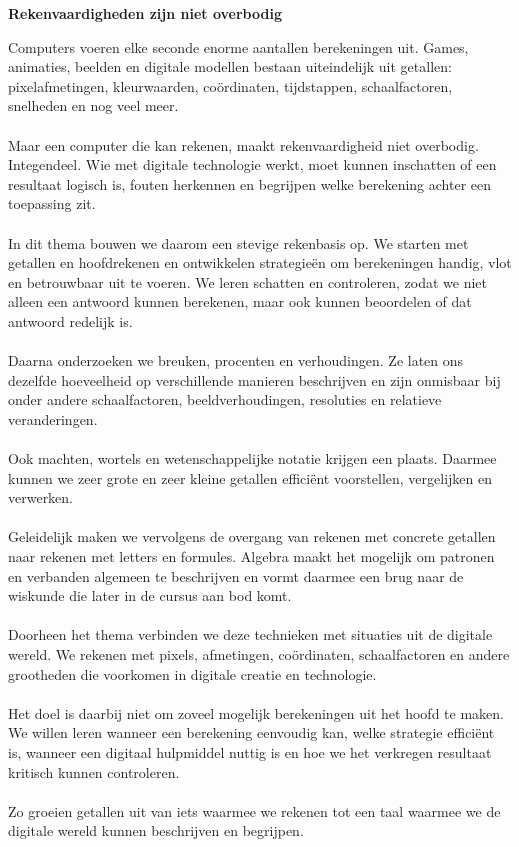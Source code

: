\documentclass{xourse}
\begin{document}
\begin{themaintro}{\textbf{Rekenvaardigheden zijn niet overbodig}}

  Computers voeren elke seconde enorme aantallen berekeningen uit. Games,
  animaties, beelden en digitale modellen bestaan uiteindelijk uit getallen:
  pixelafmetingen, kleurwaarden, coördinaten, tijdstappen, schaalfactoren,
  snelheden en nog veel meer.
  \\ \ \\
  Maar een computer die kan rekenen, maakt rekenvaardigheid niet overbodig.
  Integendeel. Wie met digitale technologie werkt, moet kunnen inschatten of
  een resultaat logisch is, fouten herkennen en begrijpen welke berekening
  achter een toepassing zit.
  \\ \ \\
  In dit thema bouwen we daarom een stevige rekenbasis op. We starten met
  getallen en hoofdrekenen en ontwikkelen strategieën om berekeningen handig,
  vlot en betrouwbaar uit te voeren. We leren schatten en controleren, zodat
  we niet alleen een antwoord kunnen berekenen, maar ook kunnen beoordelen of
  dat antwoord redelijk is.
  \\ \ \\
  Daarna onderzoeken we breuken, procenten en verhoudingen. Ze laten ons
  dezelfde hoeveelheid op verschillende manieren beschrijven en zijn
  onmisbaar bij onder andere schaalfactoren, beeldverhoudingen, resoluties en
  relatieve veranderingen.
  \\ \ \\
  Ook machten, wortels en wetenschappelijke notatie krijgen een plaats.
  Daarmee kunnen we zeer grote en zeer kleine getallen efficiënt voorstellen,
  vergelijken en verwerken.
  \\ \ \\
  Geleidelijk maken we vervolgens de overgang van rekenen met concrete
  getallen naar rekenen met letters en formules. Algebra maakt het mogelijk
  om patronen en verbanden algemeen te beschrijven en vormt daarmee een brug
  naar de wiskunde die later in de cursus aan bod komt.
  \\ \ \\
  Doorheen het thema verbinden we deze technieken met situaties uit de
  digitale wereld. We rekenen met pixels, afmetingen, coördinaten,
  schaalfactoren en andere grootheden die voorkomen in digitale creatie en
  technologie.
  \\ \ \\
  Het doel is daarbij niet om zoveel mogelijk berekeningen uit het hoofd te
  maken. We willen leren wanneer een berekening eenvoudig kan, welke strategie
  efficiënt is, wanneer een digitaal hulpmiddel nuttig is en hoe we het
  verkregen resultaat kritisch kunnen controleren.
  \\ \ \\
  Zo groeien getallen uit van iets waarmee we rekenen tot een taal waarmee we
  de digitale wereld kunnen beschrijven en begrijpen.

\end{themaintro}
\end{document}
